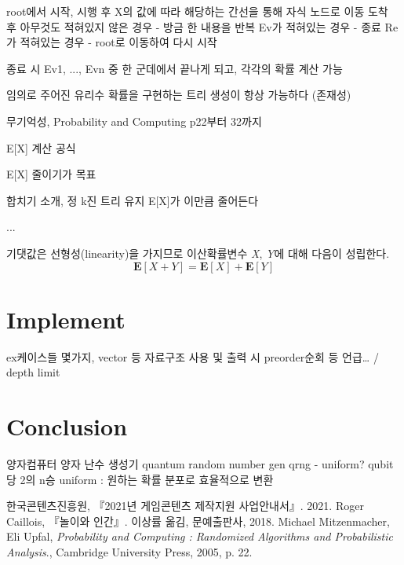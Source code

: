 \documentclass[11pt]{article}
\begin{document}
root에서 시작, 시행 후 X의 값에 따라 해당하는 간선을 통해 자식 노드로 이동
도착 후
아무것도 적혀있지 않은 경우 - 방금 한 내용을 반복
Ev가 적혀있는 경우 - 종료
Re가 적혀있는 경우 - root로 이동하여 다시 시작

종료 시 Ev1, ..., Evn 중 한 군데에서 끝나게 되고, 각각의 확률 계산 가능

임의로 주어진 유리수 확률을 구현하는 트리 생성이 항상 가능하다 (존재성)

무기억성, Probability and Computing p22부터 32까지

E[X] 계산 공식

E[X] 줄이기가 목표

합치기 소개, 정 k진 트리 유지 E[X]가 이만큼 줄어든다

...

기댓값은 선형성(linearity)을 가지므로 이산확률변수 \textit{X}, \textit{Y}에 대해 다음이 성립한다.\cite{prob22}
\[\textbf{E}[X+Y] = \textbf{E}[X] + \textbf{E}[Y]\]

\section{Implement}
ex케이스들 몇가지, vector 등 자료구조 사용 및 출력 시 preorder순회 등 언급… / depth limit

\section{Conclusion}
양자컴퓨터 양자 난수 생성기
quantum random number gen qrng - uniform?
qubit 당 2의 n승 uniform : 원하는 확률 분포로 효율적으로 변환

\begin{thebibliography}{99}
한국콘텐츠진흥원, 『2021년 게임콘텐츠 제작지원 사업안내서』. 2021.
Roger Caillois, 『놀이와 인간』. 이상률 옮김, 문예출판사, 2018.
Michael Mitzenmacher, Eli Upfal, \textit{Probability and Computing : Randomized Algorithms and Probabilistic Analysis}., Cambridge University Press, 2005, p. 22.

\end{thebibliography}
\end{document}
